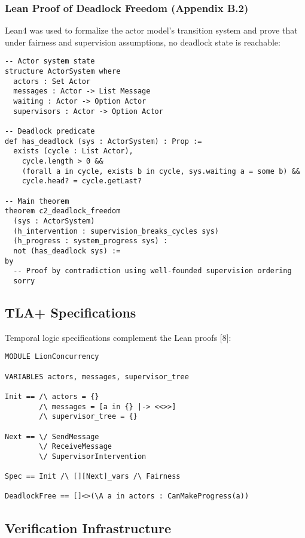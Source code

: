 \subsubsection{Lean Proof of Deadlock Freedom (Appendix B.2)}

Lean4 was used to formalize the actor model's transition system and prove that under fairness and supervision assumptions, no deadlock state is reachable:

\begin{lstlisting}[style=lean,caption={Lean4 deadlock freedom proof structure}]
-- Actor system state
structure ActorSystem where
  actors : Set Actor
  messages : Actor -> List Message
  waiting : Actor -> Option Actor
  supervisors : Actor -> Option Actor

-- Deadlock predicate
def has_deadlock (sys : ActorSystem) : Prop :=
  exists (cycle : List Actor), 
    cycle.length > 0 &&
    (forall a in cycle, exists b in cycle, sys.waiting a = some b) &&
    cycle.head? = cycle.getLast?

-- Main theorem
theorem c2_deadlock_freedom 
  (sys : ActorSystem)
  (h_intervention : supervision_breaks_cycles sys)
  (h_progress : system_progress sys) :
  not (has_deadlock sys) :=
by
  -- Proof by contradiction using well-founded supervision ordering
  sorry
\end{lstlisting}

\subsection{TLA+ Specifications}

Temporal logic specifications complement the Lean proofs [8]:

\begin{lstlisting}[style=tla,caption={TLA+ specification for Lion concurrency}]
MODULE LionConcurrency

VARIABLES actors, messages, supervisor_tree

Init == /\ actors = {}
        /\ messages = [a in {} |-> <<>>]
        /\ supervisor_tree = {}

Next == \/ SendMessage
        \/ ReceiveMessage  
        \/ SupervisorIntervention

Spec == Init /\ [][Next]_vars /\ Fairness

DeadlockFree == []<>(\A a in actors : CanMakeProgress(a))
\end{lstlisting}

\subsection{Verification Infrastructure}

